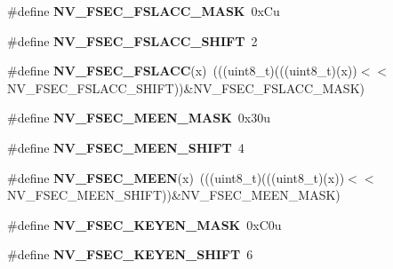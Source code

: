 \begin{DoxyCompactItemize}
\item 
\#define {\bfseries N\+V\+\_\+\+F\+S\+E\+C\+\_\+\+F\+S\+L\+A\+C\+C\+\_\+\+M\+A\+SK}~0x\+Cu\hypertarget{group__NV__Register__Masks_ga8fd3b6696c82aa96017fe25be34d19c9}{}\label{group__NV__Register__Masks_ga8fd3b6696c82aa96017fe25be34d19c9}

\item 
\#define {\bfseries N\+V\+\_\+\+F\+S\+E\+C\+\_\+\+F\+S\+L\+A\+C\+C\+\_\+\+S\+H\+I\+FT}~2\hypertarget{group__NV__Register__Masks_gaba549ee99b8ca1af3531eafd5746f6b6}{}\label{group__NV__Register__Masks_gaba549ee99b8ca1af3531eafd5746f6b6}

\item 
\#define {\bfseries N\+V\+\_\+\+F\+S\+E\+C\+\_\+\+F\+S\+L\+A\+CC}(x)~(((uint8\+\_\+t)(((uint8\+\_\+t)(x))$<$$<$N\+V\+\_\+\+F\+S\+E\+C\+\_\+\+F\+S\+L\+A\+C\+C\+\_\+\+S\+H\+I\+FT))\&N\+V\+\_\+\+F\+S\+E\+C\+\_\+\+F\+S\+L\+A\+C\+C\+\_\+\+M\+A\+SK)\hypertarget{group__NV__Register__Masks_ga75d524350a710ba87a95c927466a42d2}{}\label{group__NV__Register__Masks_ga75d524350a710ba87a95c927466a42d2}

\item 
\#define {\bfseries N\+V\+\_\+\+F\+S\+E\+C\+\_\+\+M\+E\+E\+N\+\_\+\+M\+A\+SK}~0x30u\hypertarget{group__NV__Register__Masks_ga02f5aa86e1f5bceefd0378fa736d5656}{}\label{group__NV__Register__Masks_ga02f5aa86e1f5bceefd0378fa736d5656}

\item 
\#define {\bfseries N\+V\+\_\+\+F\+S\+E\+C\+\_\+\+M\+E\+E\+N\+\_\+\+S\+H\+I\+FT}~4\hypertarget{group__NV__Register__Masks_ga13adfbdf46af9e59b446d17ce90b49c1}{}\label{group__NV__Register__Masks_ga13adfbdf46af9e59b446d17ce90b49c1}

\item 
\#define {\bfseries N\+V\+\_\+\+F\+S\+E\+C\+\_\+\+M\+E\+EN}(x)~(((uint8\+\_\+t)(((uint8\+\_\+t)(x))$<$$<$N\+V\+\_\+\+F\+S\+E\+C\+\_\+\+M\+E\+E\+N\+\_\+\+S\+H\+I\+FT))\&N\+V\+\_\+\+F\+S\+E\+C\+\_\+\+M\+E\+E\+N\+\_\+\+M\+A\+SK)\hypertarget{group__NV__Register__Masks_ga6a3e909b41d8dd2ca5f55b10e8cc4e52}{}\label{group__NV__Register__Masks_ga6a3e909b41d8dd2ca5f55b10e8cc4e52}

\item 
\#define {\bfseries N\+V\+\_\+\+F\+S\+E\+C\+\_\+\+K\+E\+Y\+E\+N\+\_\+\+M\+A\+SK}~0x\+C0u\hypertarget{group__NV__Register__Masks_ga50a87e963eeaaf5fdb904e7bac9099af}{}\label{group__NV__Register__Masks_ga50a87e963eeaaf5fdb904e7bac9099af}

\item 
\#define {\bfseries N\+V\+\_\+\+F\+S\+E\+C\+\_\+\+K\+E\+Y\+E\+N\+\_\+\+S\+H\+I\+FT}~6\hypertarget{group__NV__Register__Masks_ga3df55e24a4dc42a19afc15b4a3137bae}{}\label{group__NV__Register__Masks_ga3df55e24a4dc42a19afc15b4a3137bae}


\end{DoxyCompactItemize}
